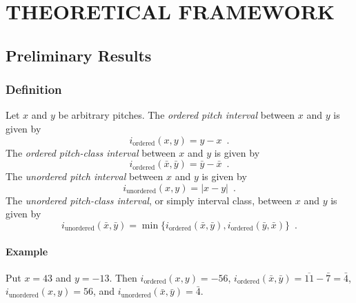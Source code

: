 \chapter{THEORETICAL FRAMEWORK}

\section{Preliminary Results}


\subsection{Definition}

Let $x$ and $y$ be arbitrary pitches. The \emph{ordered pitch interval} between $x$ and $y$ is given by
$$
i_\text{ordered}(x, y) = y - x \enspace.
$$
The \emph{ordered pitch-class interval} between $x$ and $y$ is given by
$$
i_\text{ordered}(\bar{x}, \bar{y}) = \bar{y} - \bar{x} \enspace.
$$
The \emph{unordered pitch interval} between $x$ and $y$ is given by
$$
i_\text{unordered}(x, y) = |x - y| \enspace.
$$
The \emph{unordered pitch-class interval}, or simply interval class, between $x$ and $y$ is given by
$$
i_\text{unordered}(\bar{x}, \bar{y}) = \min\{i_\text{ordered}(\bar{x}, \bar{y}), i_\text{ordered}(\bar{y}, \bar{x})\} \enspace.
$$


\subsubsection{Example}

Put $x = 43$ and $y = -13$. Then $i_\text{ordered}(x, y) = -56$, $i_\text{ordered}(\bar{x}, \bar{y}) = \overline{11} - \bar{7} = \bar{4}$, $i_\text{unordered}(x, y) = 56$, and $i_\text{unordered}(\bar{x}, \bar{y}) = \bar{4}$.

